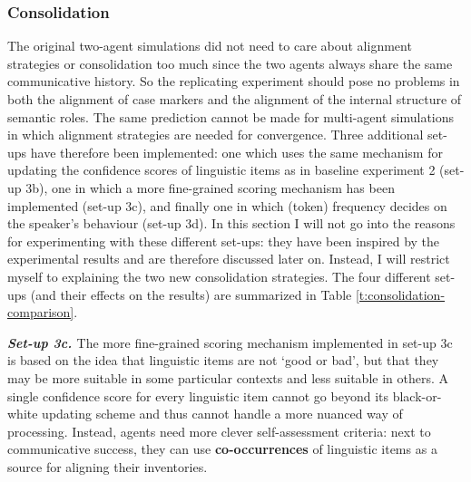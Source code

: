 \subsubsection{Consolidation}
 The original two-agent simulations did not need to care about alignment strategies or consolidation too much since the two agents always share the same communicative history. So the replicating experiment should pose no problems in both the alignment of case markers and the alignment of the internal structure of semantic roles. The same prediction cannot be made for multi-agent simulations in which alignment strategies are needed for convergence. Three additional set-ups have therefore been implemented: one which uses the same mechanism for updating the confidence scores of linguistic items as in baseline experiment 2 (set-up 3b), one in which a more fine-grained scoring mechanism has been implemented (set-up 3c), and finally one in which (token) frequency decides on the speaker's behaviour (set-up 3d). In this section I will not go into the reasons for experimenting with these different set-ups: they have been inspired by the experimental results and are therefore discussed later on. Instead, I will restrict myself to explaining the two new consolidation strategies. The four different set-ups (and their effects on the results) are summarized in Table \ref{t:consolidation-comparison}.


{\bfseries {\em Set-up 3c. }}The more fine-grained scoring mechanism implemented in set-up 3c is based on the idea that linguistic items are not `good or bad', but that they may be more suitable in some particular contexts and less suitable in others. A single confidence score for every linguistic item cannot go beyond its black-or-white updating scheme and thus cannot handle a more nuanced way of processing. Instead, agents need more clever self-assessment criteria: next to communicative success, they can use {\bfseries co-occurrences} of linguistic items as a source for aligning their inventories. 

